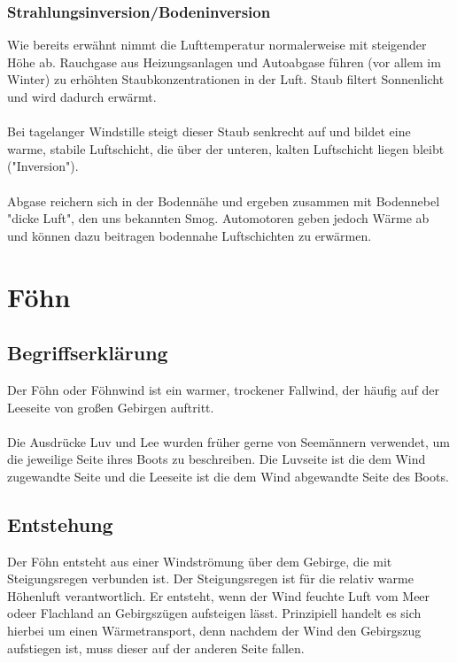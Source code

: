 \documentclass[11pt, a4paper]{article}
\begin{document}
\subsubsection{Strahlungsinversion/Bodeninversion}
Wie bereits erwähnt nimmt die Lufttemperatur normalerweise mit steigender Höhe ab. Rauchgase aus Heizungsanlagen und Autoabgase führen (vor allem im Winter) zu erhöhten Staubkonzentrationen in der Luft. Staub filtert Sonnenlicht und wird dadurch erwärmt. \\ \\
Bei tagelanger Windstille steigt dieser Staub senkrecht auf und bildet eine warme, stabile Luftschicht, die über der unteren, kalten Luftschicht liegen bleibt ("Inversion").\\ \\
Abgase reichern sich in der Bodennähe und ergeben zusammen mit Bodennebel "dicke Luft", den uns bekannten Smog. Automotoren geben jedoch Wärme ab und können dazu beitragen bodennahe Luftschichten zu erwärmen.

\newpage
\section{Föhn}
\subsection{Begriffserklärung}
Der Föhn oder Föhnwind ist ein warmer, trockener Fallwind, der häufig auf der Leeseite von großen Gebirgen auftritt. \\ \\ Die Ausdrücke Luv und Lee wurden früher gerne von Seemännern verwendet, um die jeweilige Seite ihres Boots zu beschreiben. Die Luvseite ist die dem Wind zugewandte Seite und die Leeseite ist die dem Wind abgewandte Seite des Boots.
\subsection{Entstehung}
Der Föhn entsteht aus einer Windströmung über dem Gebirge, die mit Steigungsregen verbunden ist. Der Steigungsregen ist für die relativ warme Höhenluft verantwortlich. Er entsteht, wenn der Wind feuchte Luft vom Meer odeer Flachland an Gebirgszügen aufsteigen lässt. Prinzipiell handelt es sich hierbei um einen Wärmetransport, denn nachdem der Wind den Gebirgszug aufstiegen ist, muss dieser auf der anderen Seite fallen. \cite{foehn}\\
\end{document}

